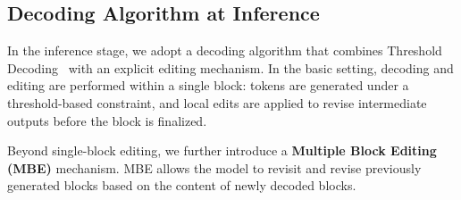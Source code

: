 \subsection{Decoding Algorithm at Inference}
In the inference stage, we adopt a decoding algorithm that combines Threshold Decoding~\citep{ma2025dinfer} with an explicit editing mechanism. In the basic setting, decoding and editing are performed within a single block: tokens are generated under a threshold-based constraint, and local edits are applied to revise intermediate outputs before the block is finalized.

Beyond single-block editing, we further introduce a \textbf{Multiple Block Editing (MBE)} mechanism. MBE allows the model to revisit and revise previously generated blocks based on the content of newly decoded blocks.